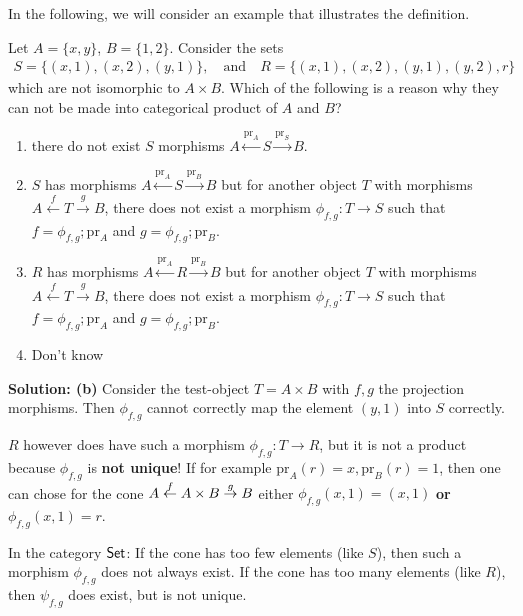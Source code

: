 In the following, we will consider an example that illustrates the definition.


Let $A = \{x,y\}$, $B = \{1,2\}$.
Consider the sets 
\begin{align*}
S = \{(x,1),(x,2),(y,1)\}
,\quad \text{and} \quad 
R = \{(x,1),(x,2),(y,1),(y,2),r\}
\end{align*}
which are not isomorphic to $A \times B$. Which of the following is a reason why they can not be made into categorical product of $A$ and $B$?
\begin{enumerate}
  \item there do not exist $S$ morphisms $A\stackrel{\text{pr}_A}{\leftarrow}S \stackrel{\text{pr}_S}{\to}B$.
  \item $S$ has morphisms $A \stackrel{\text{pr}_A}{\leftarrow} S \stackrel{\text{pr}_B}{\to} B$ but for another object $T$ with morphisms $A \stackrel{f}{\leftarrow} T \stackrel{g}{\to}B$, there does not exist a morphism $\phi_{f,g}: T \to S$ such that $f = \phi_{f,g};\text{pr}_A$ and $g = \phi_{f,g};\text{pr}_B$.
  \item $R$ has morphisms $A \stackrel{\text{pr}_A}{\leftarrow} R \stackrel{\text{pr}_B}{\to} B$ but for another object $T$ with morphisms $A \stackrel{f}{\leftarrow} T \stackrel{g}{\to}B$, there does not exist a morphism $\phi_{f,g}: T \to S$ such that $f = \phi_{f,g};\text{pr}_A$ and $g = \phi_{f,g};\text{pr}_B$.
  \item Don't know
\end{enumerate}
\textbf{Solution: (b)} 
Consider the test-object $T = A \times B$ with $f,g$ the projection morphisms. Then $\phi_{f,g}$ cannot correctly map the element $(y,1)$ into $S$ correctly.

$R$ however does have such a morphism $\phi_{f,g}: T \to R$, but it is not a product because $\phi_{f,g}$ is \textbf{not unique}!
If for example $\text{pr}_A(r) = x, \text{pr}_B(r) = 1$, then one can chose for the cone $A \stackrel{f}{\leftarrow}A \times B \stackrel{g}{\to}B$ either $\phi_{f,g}(x,1) = (x,1)$ \textbf{or} $\phi_{f,g}(x,1) = r$.

In the category $\text{\sffamily Set}$: If the cone has too few elements (like $S$), then such a morphism $\phi_{f,g}$ does not always exist.
If the cone has too many elements (like $R$), then $\psi_{f,g}$ does exist, but is not unique.




